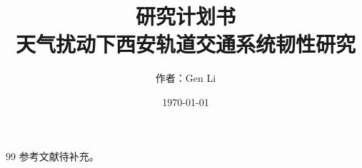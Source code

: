 \documentclass[12pt,a4paper]{ctexart}
\title{研究计划书\\[0.5em]\large 天气扰动下西安轨道交通系统韧性研究}
\author{作者：Gen Li}
\date{\today}
\begin{document}
\maketitle
\tableofcontents
\newpage








\begin{thebibliography}{99}
 参考文献待补充。
\end{thebibliography}
\end{document}
